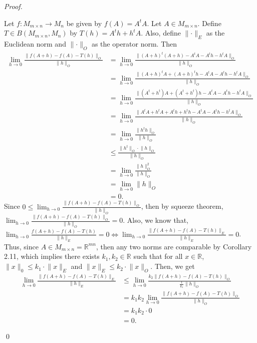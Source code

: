 \documentclass[12pt]{article}
\newenvironment{sol}
    {\emph{Proof.}
    }
    {
    \qed
    }
\begin{document}
\begin{sol}
Let $f : M_{m \times n} \to M_n$ be given by $f(A) = A^tA$. Let $A \in M_{m \times n}$. Define $T \in B(M_{m \times n}, M_n)$ by $T(h) = A^th + h^tA$. Also, define $\lVert \cdot \rVert_E$ as the Euclidean norm and $\lVert \cdot \rVert_O$ as the operator norm.  Then \begin{align*}
    \lim_{h \to 0} \frac{\lVert f(A + h) - f(A) - T(h)\rVert_O}{\lVert h \rVert_O} &= \lim_{h \to 0} \frac{\lVert (A+h)^t(A+h) - A^tA - A^th - h^tA \rVert_O}{\lVert h \rVert_O} \tag*{(Definition of $f$ and $T$)} \\ &= \lim_{h \to 0} \frac{\lVert (A+h)^tA + (A+h)^th - A^tA - A^th - h^tA \rVert_O}{\lVert h \rVert_O} \tag*{(By distribution)} \\ &= \lim_{h \to 0} \frac{\lVert (A^t+h^t)A + (A^t+h^t)h - A^tA - A^th - h^tA \rVert_O}{\lVert h \rVert_O} \tag*{(Property of transpose)} \\ &= \lim_{h \to 0} \frac{\lVert A^tA+h^tA + A^th+h^th - A^tA - A^th - h^tA \rVert_O}{\lVert h \rVert_O} \tag*{(By distribution)} \\ &= \lim_{h \to 0} \frac{\lVert h^th \rVert_O}{\lVert h \rVert_O} \tag*{(By subtraction)} \\ &\leq \frac{\lVert h^t \rVert_O \cdot \lVert h \rVert_O}{\lVert h \rVert_O} \tag*{(Property of operator norm)} \\ &= \lim_{h \to 0} \frac{\lVert h \rVert_O^2}{\lVert h \rVert_O} \tag*{(Property of operator norm)} \\ &= \lim_{h \to 0} \lVert h \rVert_O \\ &= 0.
\end{align*}
Since $0 \leq \lim_{h \to 0} \frac{\lVert f(A + h) - f(A) - T(h)\rVert_O}{\lVert h \rVert_O}$, then by squeeze theorem, $\lim_{h \to 0} \frac{\lVert f(A + h) - f(A) - T(h)\rVert_O}{\lVert h \rVert_O} = 0$. Also, we know that, $\lim_{h \to 0} \frac{f(A+h) - f(A) - T(h)}{\lVert h \rVert_E} = 0 \Longleftrightarrow\lim_{h \to 0} \frac{\lVert f(A + h) - f(A) - T(h)\rVert_E}{\lVert h \rVert_E} = 0$. Thus, since $A \in M_{m \times n} = \mathbb{R}^{mn}$, then any two norms are comparable by Corollary 2.11, which implies there exists $k_1,k_2 \in \mathbb{R}$ such that for all $x \in \mathbb{R}$, $\lVert x \rVert_0 \leq k_1 \cdot \lVert x \rVert_E$ and $\lVert x \rVert_E \leq k_2 \cdot \lVert x \rVert_O$. Then, we get \begin{align*}
    \lim_{h \to 0} \frac{\lVert f(A+h) - f(A) - T(h) \rVert_E}{\lVert h \rVert_E} &\leq \lim_{h \to 0} \frac{k_2 \lVert f(A+h) - f(A) - T(h) \rVert_O}{\frac{1}{k_1}\lVert h \rVert_O} \tag*{(By comparability of $\lVert \cdot \rVert_E$ and $\lVert \cdot \rVert_O$)} \\ &= k_1k_2 \lim_{h \to 0} \frac{\lVert f(A+h) - f(A) - T(h) \rVert_O}{\lVert h \rVert_O} \tag*{(Property of limits)} \\ &= k_1k_2 \cdot 0 \\ &= 0.

\end{align*}
\end{sol}
\end{document}
